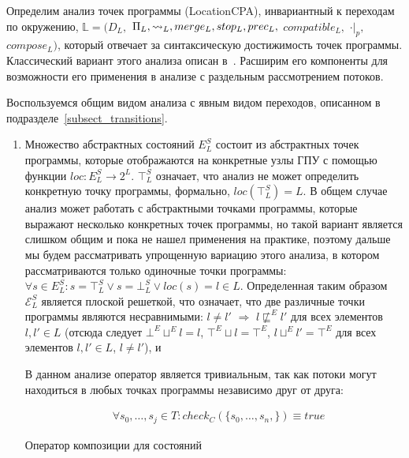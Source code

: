 Определим анализ точек программы (LocationCPA), инвариантный к переходам по окружению,
$\mathbb{L}=(D_{L},$ $\Pi_{L}, \leadsto_{L}, merge_{L}, stop_{L}, prec_{L},$ $compatible_{L},$ $\cdot|_p,$ $compose_L)$, который отвечает за синтаксическую достижимость точек программы.
Классический вариант этого анализа описан в~\cite{Beyer08}.
Расширим его компоненты для возможности его применения в анализе с раздельным рассмотрением потоков.

Воспользуемся общим видом анализа с явным видом переходов, описанном в подразделе~\ref{subsect_transitions}.
 
\begin{enumerate}

\item 
Множество абстрактных состояний $E^S_L$ состоит из абстрактных точек программы, которые отображаются на конкретные узлы ГПУ с помощью функции $loc: E^S_L \rightarrow 2^L$.
$\top^S_L$ означает, что анализ не может определить конкретную точку программы, формально, $loc(\top^S_L) = L$.
В общем случае анализ может работать с абстрактными точками программы, которые выражают несколько конкретных точек программы, но такой вариант является слишком общим и пока не нашел применения на практике, поэтому дальше мы будем рассматривать упрощенную вариацию этого анализа, в котором рассматриваются только одиночные точки программы: $\forall s \in E^S_L: s = \top^S_L \lor s=\bot^S_L \lor loc(s) = l \in L$.
Определенная таким образом $\mathcal{E}^S_L$ является плоской решеткой, что означает, что две различные точки программы являются несравнимыми: $l \neq l'$ $\Rightarrow$ $l \not\sqsubseteq^E l'$ для всех элементов $l, l' \in L$ 
(отсюда следует $\bot^E \sqcup^E l = l$, $\top^E \sqcup l=\top^E$, $ l\sqcup^E l' = \top^E$ для всех элементов $l,l'\in L$, $l\neq l'$), 
и

В данном анализе оператор является тривиальным, так как потоки могут находиться в любых точках программы независимо друг от друга:

\begin{align*}
& \forall s_0, \dots, s_j \in T: check_C(\{s_0, \dots, s_n,\}) \equiv true
\end{align*}

Оператор композиции для состояний


\end{enumerate}
